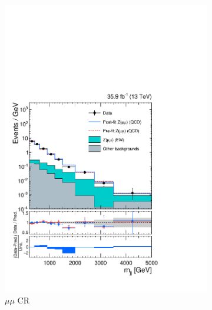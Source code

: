 \begin{figure}[]
\begin{center}
\begin{subfigure}[t]{0.32\textwidth}
            \includegraphics[width=\textwidth]{figures/vbf/fits/vbf_PULLS_prefit_postfit_dimuon.pdf}
            \caption{$\mu\mu$ CR}
        \end{subfigure}
        \begin{subfigure}[t]{0.32\textwidth}

\end{subfigure}
\end{center}
\end{figure}
